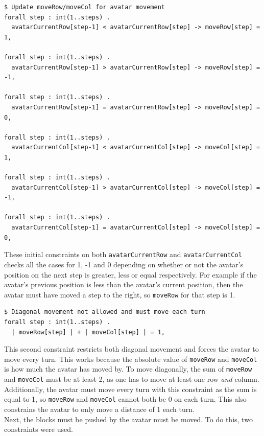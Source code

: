\documentclass{article}
\newcommand{\n}[0]{\\[\baselineskip]}
\begin{document}
\begin{lstlisting}[caption={Updating \texttt{moveRow} and \texttt{moveCol}},captionpos=b]
$ Update moveRow/moveCol for avatar movement
forall step : int(1..steps) .
  avatarCurrentRow[step-1] < avatarCurrentRow[step] -> moveRow[step] = 1,

forall step : int(1..steps) .
  avatarCurrentRow[step-1] > avatarCurrentRow[step] -> moveRow[step] = -1,

forall step : int(1..steps) .
  avatarCurrentRow[step-1] = avatarCurrentRow[step] -> moveRow[step] = 0,

forall step : int(1..steps) .
  avatarCurrentCol[step-1] < avatarCurrentCol[step] -> moveCol[step] = 1,

forall step : int(1..steps) .
  avatarCurrentCol[step-1] > avatarCurrentCol[step] -> moveCol[step] = -1,

forall step : int(1..steps) .
  avatarCurrentCol[step-1] = avatarCurrentCol[step] -> moveCol[step] = 0,
\end{lstlisting}
These initial constraints on both \texttt{avatarCurrentRow} and \texttt{avatarCurrentCol} checks all the cases for 1, -1 and 0 depending on whether or not the avatar's position on the next step is greater, less or equal respectively. For example if the avatar's previous position is less than the avatar's current position, then the avatar must have moved a step to the right, so \texttt{moveRow} for that step is 1. 
\\
\begin{lstlisting}[caption={Prevent diagonal movement and force movement every turn}, captionpos=b]
$ Diagonal movement not allowed and must move each turn
forall step : int(1..steps) .
  | moveRow[step] | + | moveCol[step] | = 1,
\end{lstlisting}
This second constraint restricts both diagonal movement and forces the avatar to move every turn. This works because the absolute value of \texttt{moveRow} and \texttt{moveCol} is how much the avatar has moved by. To move diagonally, the sum of \texttt{moveRow} and \texttt{moveCol} must be at least 2, as one has to move at least one row \textit{and} column. Additionally, the avatar must move every turn with this constraint as the sum is equal to 1, so \texttt{moveRow} and \texttt{moveCol} cannot both be 0 on each turn. This also constrains the avatar to only move a distance of 1 each turn.
\n
Next, the blocks must be pushed by the avatar must be moved. To do this, two constraints were used.
\end{document}
